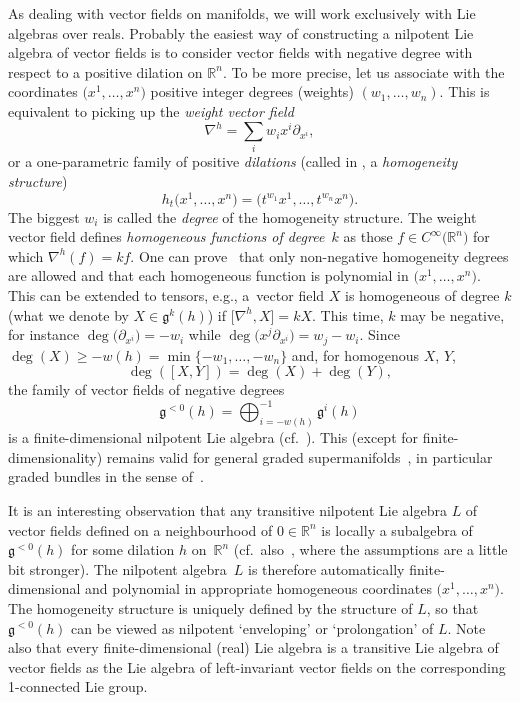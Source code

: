 As dealing with vector fields on manifolds, we will work exclusively with Lie algebras over reals.
Probably the easiest way of constructing a nilpotent Lie algebra of vector fields is to consider vector fields with negative degree with respect to a positive dilation on ${\mathbb R}^n$. To be more precise, let us associate with the coordinates $\big(x^1,\dots,x^n\big)$ positive integer degrees (weights) $(w_1,\dots,w_n)$. This is equivalent to picking up
the \emph{weight vector field}
\[
\nabla^h=\sum_iw_ix^i\partial_{x^i} ,
\] or a one-parametric family of positive \emph{dilations} (called in \cite{Bruce:16, Grabowski:2006,Grabowski:2012}, a \emph{homogeneity structure})
\[
h_t\big(x^1,\dots,x^n\big)=\big(t^{w_1}x^1,\dots,t^{w_n}x^n\big) .
\]
The biggest $w_i$ is called the \emph{degree} of the homogeneity structure. The weight vector field defines \emph{homogeneous functions of degree~$k$} as those $f\in C^\infty\big({\mathbb R}^n\big)$
for which $\nabla^h(f)=kf$. One can prove~\cite{Grabowski:2012} that only non-negative homogeneity degrees are allowed and that each homogeneous function is polynomial in $\big(x^1,\dots,x^n\big)$. This can be extended to tensors, e.g., a~vector field $X$ is homogeneous of degree $k$ (what we denote by $X\in\mathfrak{g}^k(h)$) if $\big[\nabla^h,X\big]=kX$. This time, $k$ may be negative, for instance $\deg\big(\partial_{x^i}\big)=-w_i$ while $\deg\big(x^j\partial_{x^i}\big)=w_j-w_i$.
Since $\deg(X)\ge -w(h)=\min\{-w_1,\dots,-w_n\}$ and, for homogenous $X$, $Y$,
\[ \deg([X,Y])=\deg(X)+\deg(Y) ,\]
the family of vector fields of negative degrees
\[ \mathfrak{g}^{<0}(h)=\bigoplus_{i=-w(h)}^{-1}\mathfrak{g}^i(h)\]
is a finite-dimensional nilpotent Lie algebra (cf.~\cite{JG90,MK88}).
This (except for finite-dimensionality) remains valid for general graded supermanifolds~\cite{Voronov10}, in particular graded bundles in the sense of~\cite{Grabowski:2012}.

It is an interesting observation that any transitive nilpotent Lie algebra $L$ of vector fields defined on a neighbourhood of $0\in{\mathbb R}^n$ is locally a subalgebra of $\mathfrak{g}^{<0}(h)$ for some dilation $h$ on~${\mathbb R}^n$ \cite{JG90} (cf.\ also~\cite{MK88}, where the assumptions are a little bit stronger). The nilpotent algebra~$L$ is therefore automatically finite-dimensional and polynomial in appropriate homogeneous coordinates $\big(x^1,\dots,x^n\big)$. The homogeneity structure is uniquely defined by the structure of $L$, so that $\mathfrak{g}^{<0}(h)$ can be viewed as nilpotent `enveloping' or `prolongation' of $L$. Note also that every finite-dimensional (real) Lie algebra is a transitive Lie algebra of vector fields as the Lie algebra of left-invariant vector fields on the corresponding 1-connected Lie group.

